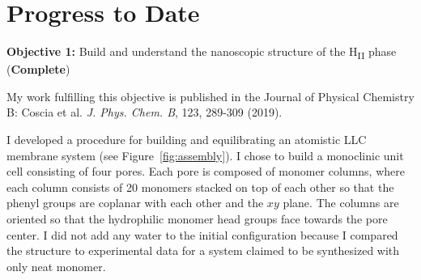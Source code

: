 \documentclass{article}
\begin{document}
  \section{Progress to Date}\label{section:progress}
  
  \textbf{\large Objective 1:} {\large Build and understand the nanoscopic structure
  of the H\textsubscript{II} phase} (\textcolor{green!40!olive}{\textbf{Complete}})
  
  \noindent My work fulfilling this objective is published in the Journal of Physical 
  Chemistry B: Coscia et al. \textit{J. Phys. Chem. B}, 123, 289-309 (2019).

  I developed a procedure for building and equilibrating an atomistic LLC membrane 
  system (see Figure~\ref{fig:assembly}). I chose to build a monoclinic unit cell
  consisting of four pores. Each pore is composed of monomer columns, where each
  column consists of 20 monomers stacked on top of each other so that the phenyl
  groups are coplanar with each other and the $xy$ plane. The columns are oriented
  so that the hydrophilic monomer head groups face towards the pore center. I did
  not add any water to the initial configuration because I compared the structure
  to experimental data for a system claimed to be synthesized with only neat monomer. 
  

\end{document}
